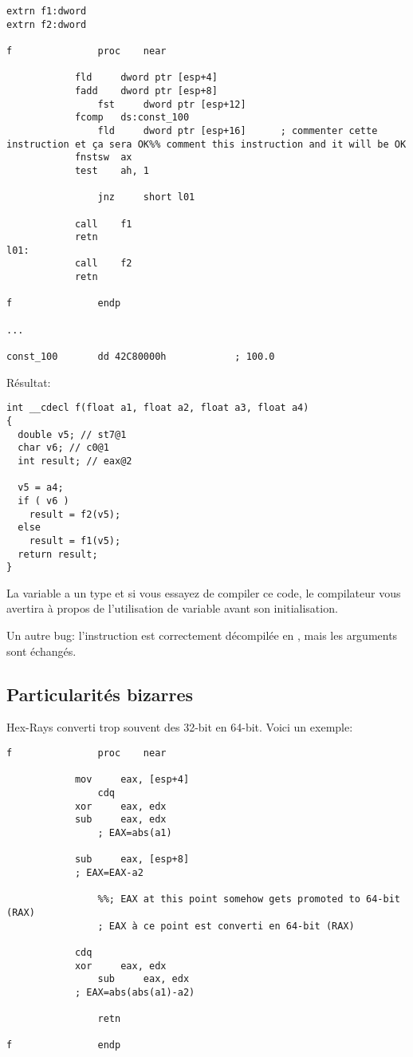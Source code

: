\begin{lstlisting}
extrn f1:dword
extrn f2:dword

f               proc    near

	        fld     dword ptr [esp+4]
        	fadd    dword ptr [esp+8]
                fst     dword ptr [esp+12]
	        fcomp   ds:const_100
                fld     dword ptr [esp+16]      ; commenter cette instruction et ça sera OK%% comment this instruction and it will be OK
	        fnstsw  ax
        	test    ah, 1

                jnz     short l01

	        call    f1
        	retn
l01:
	        call    f2
        	retn

f               endp

...

const_100       dd 42C80000h            ; 100.0
\end{lstlisting}

Résultat:

\begin{lstlisting}
int __cdecl f(float a1, float a2, float a3, float a4)
{
  double v5; // st7@1
  char v6; // c0@1
  int result; // eax@2

  v5 = a4;
  if ( v6 )
    result = f2(v5);
  else
    result = f1(v5);
  return result;
}
\end{lstlisting}

La variable  a un type  et si vous essayez de compiler ce code, le
compilateur vous avertira à propos de l'utilisation de variable avant son initialisation.

Un autre bug: l'instruction  est correctement décompilée en ,
mais les arguments sont échangés.

\subsection{Particularités bizarres}

Hex-Rays converti trop souvent des  32-bit en 64-bit.
Voici un exemple:

\begin{lstlisting}
f               proc    near

	        mov     eax, [esp+4]
                cdq
	        xor     eax, edx
        	sub     eax, edx
                ; EAX=abs(a1)

	        sub     eax, [esp+8]
        	; EAX=EAX-a2

                %%; EAX at this point somehow gets promoted to 64-bit (RAX)
                ; EAX à ce point est converti en 64-bit (RAX)

	        cdq
        	xor     eax, edx
                sub     eax, edx
	        ; EAX=abs(abs(a1)-a2)

                retn

f               endp
\end{lstlisting}

